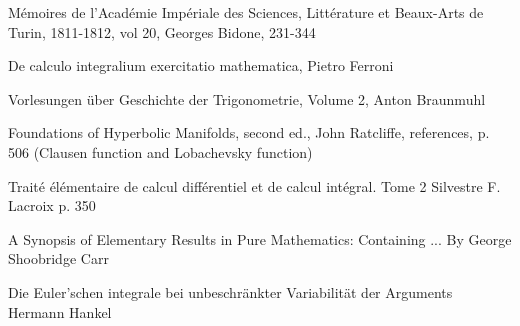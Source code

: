 \documentclass{article}
\begin{document}
 Mémoires de l'Académie Impériale des Sciences, Littérature et Beaux-Arts de Turin, 1811-1812, vol 20, Georges Bidone, 231-344
 
 De calculo integralium exercitatio mathematica, Pietro Ferroni
 
 Vorlesungen über Geschichte der Trigonometrie, Volume 2, Anton Braunmuhl
 
 Foundations of Hyperbolic Manifolds, second ed., John Ratcliffe, references, p. 506 (Clausen function and Lobachevsky function)
 
Traité élémentaire de calcul différentiel et de calcul intégral. Tome 2
Silvestre F. Lacroix
 p. 350
 
 A Synopsis of Elementary Results in Pure Mathematics: Containing ...
 By George Shoobridge Carr
 
Die Euler'schen integrale bei unbeschränkter Variabilität der Arguments
Hermann Hankel
 
 \nocite{*}



\end{document}
